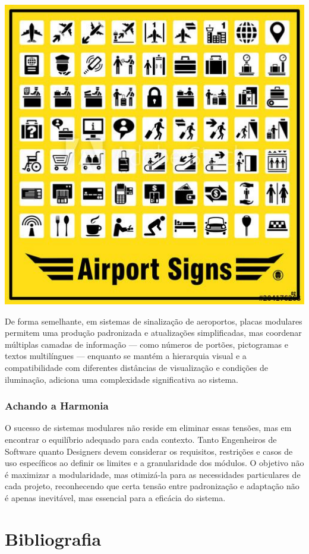 \documentclass[12pt]{article}
\begin{document}
\vspace{5px}

\noindent
\begin{minipage}{0.4\textwidth}
\includegraphics[width=1\textwidth]{airport-signs.jpg}
\end{minipage}
\begin{minipage}{0.6\textwidth}\raggedright
De forma semelhante, em sistemas de sinalização de aeroportos, placas modulares permitem uma produção padronizada e atualizações simplificadas, mas coordenar múltiplas camadas de informação — como números de portões, pictogramas e textos multilíngues — enquanto se mantém a hierarquia visual e a compatibilidade com diferentes distâncias de visualização e condições de iluminação, adiciona uma complexidade significativa ao sistema.
\end{minipage}

\subsubsection{Achando a Harmonia}
O sucesso de sistemas modulares não reside em eliminar essas tensões, mas em encontrar o equilíbrio adequado para cada contexto. Tanto Engenheiros de Software quanto Designers devem considerar os requisitos, restrições e casos de uso específicos ao definir os limites e a granularidade dos módulos. O objetivo não é maximizar a modularidade, mas otimizá-la para as necessidades particulares de cada projeto, reconhecendo que certa tensão entre padronização e adaptação não é apenas inevitável, mas essencial para a eficácia do sistema.

\section{Bibliografia}
\renewcommand{\bibname}{}
\renewcommand{\refname}{}
\printbibliography
\end{document}
